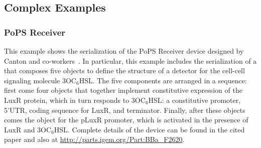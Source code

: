 \subsection{Complex Examples}

\subsubsection{PoPS Receiver}

This example shows the serialization of the PoPS Receiver device designed by Canton and co-workers~\cite{canton-natbio-2008}. 
In particular, this example includes the serialization of a  that composes five   objects to define the structure of a detector for the cell-cell signaling molecule 3OC$_6$HSL.
The five components are arranged in a sequence:
first come four  objects that together implement constitutive expression of the LuxR protein, which in turn responds to 3OC$_6$HSL: a constitutive promoter, 5'UTR, coding sequence for LuxR, and terminator.
Finally, after these objects comes the  object for the pLuxR promoter, which is activated in the presence of LuxR and 3OC$_6$HSL.
%
Complete details of the device can be found in the cited paper and also at \url{http://parts.igem.org/Part:BBa_F2620}.


